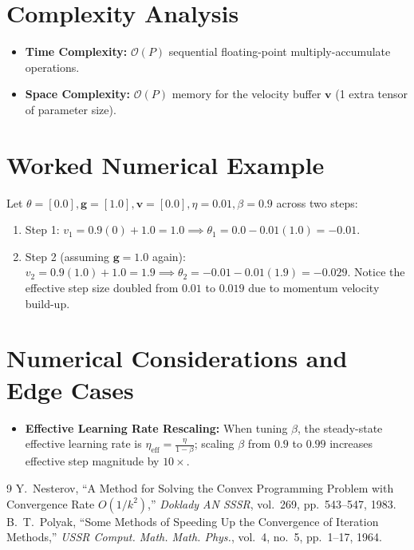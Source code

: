 \documentclass[11pt]{article}
\begin{document}
\section{Complexity Analysis}
\label{sec:complexity}

\begin{itemize}
    \item \textbf{Time Complexity:} $\mathcal{O}(P)$ sequential floating-point multiply-accumulate operations.
    \item \textbf{Space Complexity:} $\mathcal{O}(P)$ memory for the velocity buffer $\mathbf{v}$ (1 extra tensor of parameter size).
\end{itemize}

\section{Worked Numerical Example}
\label{sec:worked_example}

Let $\theta = [0.0], \mathbf{g} = [1.0], \mathbf{v} = [0.0], \eta = 0.01, \beta = 0.9$ across two steps:
\begin{enumerate}
    \item Step 1: $v_1 = 0.9(0) + 1.0 = 1.0 \implies \theta_1 = 0.0 - 0.01(1.0) = -0.01$.
    \item Step 2 (assuming $\mathbf{g} = 1.0$ again): $v_2 = 0.9(1.0) + 1.0 = 1.9 \implies \theta_2 = -0.01 - 0.01(1.9) = -0.029$.
    Notice the effective step size doubled from $0.01$ to $0.019$ due to momentum velocity build-up.
\end{enumerate}

\section{Numerical Considerations and Edge Cases}
\label{sec:numerical}

\begin{itemize}
    \item \textbf{Effective Learning Rate Rescaling:} When tuning $\beta$, the steady-state effective learning rate is $\eta_{\mathrm{eff}} = \frac{\eta}{1 - \beta}$; scaling $\beta$ from $0.9$ to $0.99$ increases effective step magnitude by $10\times$.
\end{itemize}

\begin{thebibliography}{9}
 Y.~Nesterov, ``A Method for Solving the Convex Programming Problem with Convergence Rate $O(1/k^2)$,'' \emph{Doklady AN SSSR}, vol.~269, pp.~543--547, 1983.
 B.~T.~Polyak, ``Some Methods of Speeding Up the Convergence of Iteration Methods,'' \emph{USSR Comput. Math. Math. Phys.}, vol.~4, no.~5, pp.~1--17, 1964.
\end{thebibliography}
\end{document}
